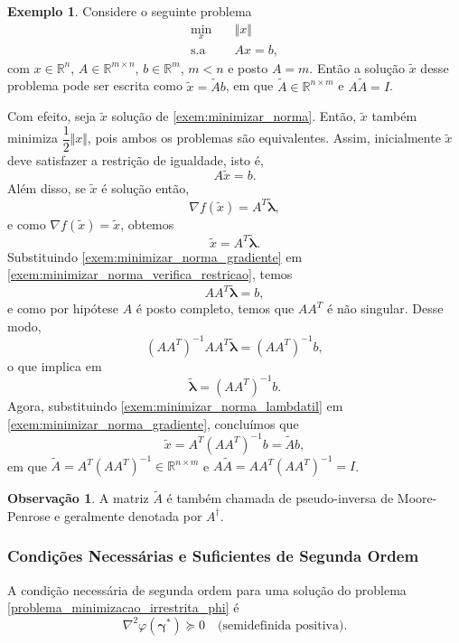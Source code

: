 \documentclass[12pt,a4paper]{scrartcl}
\def\RR{\mathds{R}}
\theoremstyle{definition}%
\newtheorem{exem}{Exemplo}
\newtheorem{obs}{Observação}
\begin{document}
\begin{exem}
Considere o seguinte problema
\[\begin{aligned} \label{exem:minimizar_norma}
\min_{x} & \quad \Vert x \Vert \\
\text{s.a} & \quad Ax=b,
\end{aligned} \]
com $x \in \RR^{n}$, $A \in \RR^{m\times n}$, $b\in \RR^{m}$, $m<n$ e posto $A=m$. Então a solução $\tilde{x}$ desse problema pode ser escrita como $\tilde{x} = \tilde{A} b$, em que $\tilde{A} \in \RR^{n\times m}$ e $A\tilde{A} = I$.
\end{exem}
Com efeito, seja $\tilde{x}$ solução de \eqref{exem:minimizar_norma}. Então, $\tilde{x}$ também minimiza $\dfrac{1}{2}\Vert x \Vert$, pois ambos os problemas são equivalentes. Assim, inicialmente $\tilde{x}$ deve satisfazer a restrição de igualdade, isto é,
\[ \label{exem:minimizar_norma_verifica_restricao}
A\tilde{x} = b .
\]
Além disso, se $\tilde{x}$ é solução então,
\[
\nabla f(\tilde{x}) =A^{T} \tilde{\boldsymbol{\lambda}},
\]
e como $\nabla f(\tilde{x}) = \tilde{x}$, obtemos 
\[ \label{exem:minimizar_norma_gradiente}
\tilde{x} = A^{T} \tilde{\boldsymbol{\lambda}} .
\]
Substituindo \eqref{exem:minimizar_norma_gradiente} em \eqref{exem:minimizar_norma_verifica_restricao}, temos
\[
AA^{T} \tilde{\boldsymbol{\lambda}} = b,
\]
e como por hipótese $A$ é posto completo, temos que $AA^{T}$ é não singular. Desse modo,
\[
(AA^{T})^{-1} AA^{T} \tilde{\boldsymbol{\lambda}} = (AA^{T})^{-1} b,
\]
o que implica em 
\[ \label{exem:minimizar_norma_lambdatil}
\tilde{\boldsymbol{\lambda}} = (AA^{T})^{-1} b.
\]
Agora, substituindo \eqref{exem:minimizar_norma_lambdatil} em \eqref{exem:minimizar_norma_gradiente}, concluímos que
\[
\tilde{x} = A^{T}(AA^{T})^{-1}b = \tilde{A} b,
\]
em que $\tilde{A} = A^{T}(AA^{T})^{-1} \in \RR^{n\times m}$ e $A\tilde{A} = AA^{T}(AA^{T})^{-1} = I$.

\begin{obs}
A matriz $\tilde{A}$ é também chamada de pseudo-inversa de Moore-Penrose e geralmente denotada por $A^{\dag}$. 
\end{obs}


\subsubsection{Condições Necessárias e Suficientes de Segunda Ordem}

A condição necessária de segunda ordem para uma solução do problema \eqref{problema_minimizacao_irrestrita_phi} é
\[ \label{hessiana_phi}
\nabla^{2} \varphi (\boldsymbol{\gamma}^{*}) \succcurlyeq 0 \quad \text{(semidefinida positiva)}.
\]
\end{document}
